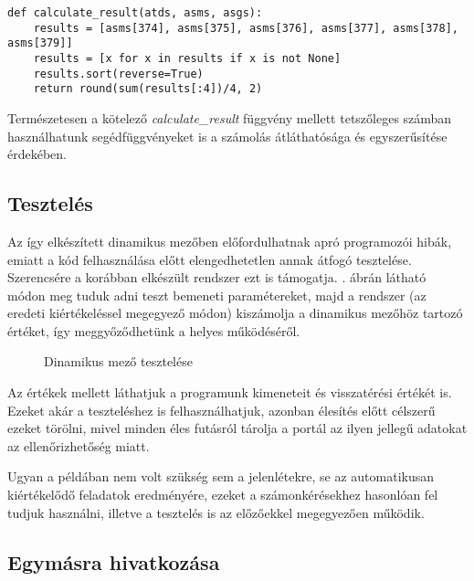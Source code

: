 \begin{lstlisting}
def calculate_result(atds, asms, asgs):
    results = [asms[374], asms[375], asms[376], asms[377], asms[378], asms[379]]
    results = [x for x in results if x is not None]
    results.sort(reverse=True)
    return round(sum(results[:4])/4, 2)
\end{lstlisting}

Természetesen a kötelező \textit{calculate\_result} függvény mellett tetszőleges számban használhatunk segédfüggvényeket is a számolás átláthatósága és egyszerűsítése érdekében.

\subsection{Tesztelés}
Az így elkészített dinamikus mezőben előfordulhatnak apró programozói hibák, emiatt a kód felhasználása előtt elengedhetetlen annak átfogó tesztelése. Szerencsére a korábban elkészült rendszer ezt is támogatja. . ábrán látható módon meg tuduk adni teszt bemeneti paramétereket, majd a rendszer (az eredeti kiértékeléssel megegyező módon) kiszámolja a dinamikus mezőhöz tartozó értéket, így meggyőződhetünk a helyes működéséről.

\begin{figure}[h]
    \centering
    \caption{Dinamikus mező tesztelése}
    \label{fig:jporta_dynamic_test}
\end{figure}

Az értékek mellett láthatjuk a programunk kimeneteit és visszatérési értékét is. Ezeket akár a teszteléshez is felhasználhatjuk, azonban élesítés előtt célszerű ezeket törölni, mivel minden éles futásról tárolja a portál az ilyen jellegű adatokat az ellenőrizhetőség miatt.

Ugyan a példában nem volt szükség sem a jelenlétekre, se az automatikusan kiértékelődő feladatok eredményére, ezeket a számonkérésekhez hasonlóan fel tudjuk használni, illetve a tesztelés is az előzőekkel megegyezően működik.

\subsection{Egymásra hivatkozása}